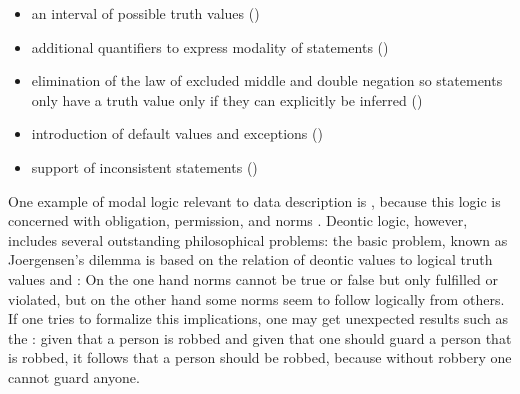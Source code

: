 \begin{itemize}
 \item an interval of possible truth values ()
 \item additional quantifiers to express modality of statements ()
 \item elimination of the law of excluded middle and double negation so 
   statements only have a truth value only if they can explicitly be inferred 
   ()
 \item introduction of default values and exceptions ()
 \item support of inconsistent statements ()
\end{itemize}

One example of modal logic relevant to data description is , because this logic is concerned with obligation, permission, and norms
\cite{McNamara2010}. Deontic logic, however, includes several outstanding
philosophical problems: the basic problem, known as Joergensen's dilemma is
based on the relation of deontic values to logical truth values and
\cite{Jorgensen1937}: On the one hand norms cannot be true or false but only
fulfilled or violated, but on the other hand some norms seem to follow
logically from others. If one tries to formalize this implications, one may get
unexpected results such as the : given that a
person is robbed and given that one should guard a person that is robbed, it
follows that a person should be robbed, because without robbery one cannot
guard anyone. 

